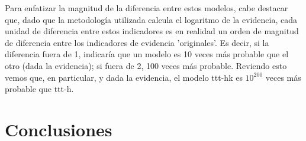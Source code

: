 \documentclass{article}
\begin{document}
Para enfatizar la magnitud de la diferencia entre estos modelos, cabe destacar que, dado que la metodología utilizada calcula el logaritmo de la evidencia, cada unidad de diferencia entre estos indicadores es en realidad un orden de magnitud de diferencia entre los indicadores de evidencia 'originales'. Es decir, si la diferencia fuera de 1, indicaría que un modelo es 10 veces más probable que el otro (dada la evidencia); si fuera de 2, 100 veces más probable. Reviendo esto vemos que, en particular, y dada la evidencia, el modelo ttt-hk es $10^200$ veces más probable que ttt-h.





\section{Conclusiones}
\end{document}
